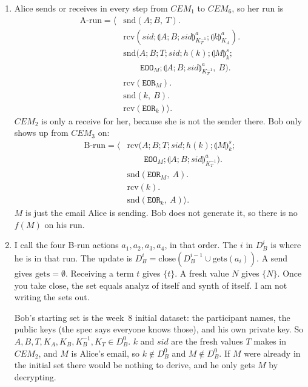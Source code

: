 \documentclass{article}
\newcommand{\setenc}[1]{\llparenthesis #1 \rrparenthesis}
\newcommand{\sym}[1]{\texttt{#1}}
\begin{document}
\begin{enumerate}
    \item Alice sends or receives in every step from $CEM_1$ to $CEM_6$, so her run is
    \begin{align*}
        \text{A-run} = \langle
            &\mathrm{snd}(A;B,\ T).\\
            &\mathrm{rcv}(sid;\setenc{A;B;sid}^a_{K^{-1}_T};\setenc{k}^a_{K_A}).\\
            &\mathrm{snd}(A;B;T;sid;h(k);\setenc{M}^s_{k};\\
            &\qquad \sym{EOO}_M;\setenc{A;B;sid}^a_{K^{-1}_T},\ B).\\
            &\mathrm{rcv}(\sym{EOR}_M).\\
            &\mathrm{snd}(k,\ B).\\
            &\mathrm{rcv}(\sym{EOR}_k)
        \rangle.
    \end{align*}
    $CEM_2$ is only a receive for her, because she is not the sender there. Bob only shows up from $CEM_3$ on:
    \begin{align*}
        \text{B-run} = \langle
            &\mathrm{rcv}(A;B;T;sid;h(k);\setenc{M}^s_{k};\\
            &\qquad \sym{EOO}_M;\setenc{A;B;sid}^a_{K^{-1}_T}).\\
            &\mathrm{snd}(\sym{EOR}_M,\ A).\\
            &\mathrm{rcv}(k).\\
            &\mathrm{snd}(\sym{EOR}_k,\ A)
        \rangle.
    \end{align*}
    $M$ is just the email Alice is sending. Bob does not generate it, so there is no $f(M)$ on his run.

    \item I call the four B-run actions $a_1, a_2, a_3, a_4$, in that order. The $i$ in $D^i_B$ is where he is in that run. The update is $D^i_B = \mathrm{close}(D^{i-1}_B \cup \mathrm{gets}(a_i))$. A send gives $\mathrm{gets} = \emptyset$. Receiving a term $t$ gives $\{t\}$. A fresh value $N$ gives $\{N\}$. Once you take $\mathrm{close}$, the set equals $\mathrm{analyz}$ of itself and $\mathrm{synth}$ of itself. I am not writing the sets out.

    Bob's starting set is the week~8 initial dataset: the participant names, the public keys (the spec says everyone knows those), and his own private key. So $A, B, T, K_A, K_B, K_B^{-1}, K_T \in D^0_B$. $k$ and $sid$ are the fresh values $T$ makes in $CEM_2$, and $M$ is Alice's email, so $k \notin D^0_B$ and $M \notin D^0_B$. If $M$ were already in the initial set there would be nothing to derive, and he only gets $M$ by decrypting.


\end{enumerate}
\end{document}
